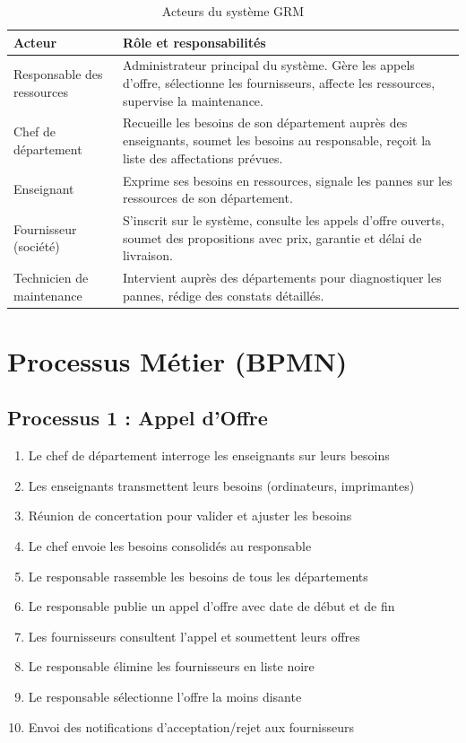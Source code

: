\begin{table}[h!]
\centering
\begin{tabularx}{\textwidth}{|l|X|}
\hline
\textbf{Acteur} & \textbf{Rôle et responsabilités} \\
\hline
Responsable des ressources & Administrateur principal du système. Gère les appels d'offre, sélectionne les fournisseurs, affecte les ressources, supervise la maintenance. \\
\hline
Chef de département & Recueille les besoins de son département auprès des enseignants, soumet les besoins au responsable, reçoit la liste des affectations prévues. \\
\hline
Enseignant & Exprime ses besoins en ressources, signale les pannes sur les ressources de son département. \\
\hline
Fournisseur (société) & S'inscrit sur le système, consulte les appels d'offre ouverts, soumet des propositions avec prix, garantie et délai de livraison. \\
\hline
Technicien de maintenance & Intervient auprès des départements pour diagnostiquer les pannes, rédige des constats détaillés. \\
\hline
\end{tabularx}
\caption{Acteurs du système GRM}
\end{table}

\section{Processus Métier (BPMN)}

\subsection{Processus 1 : Appel d'Offre}

\begin{enumerate}
    \item Le chef de département interroge les enseignants sur leurs besoins
    \item Les enseignants transmettent leurs besoins (ordinateurs, imprimantes)
    \item Réunion de concertation pour valider et ajuster les besoins
    \item Le chef envoie les besoins consolidés au responsable
    \item Le responsable rassemble les besoins de tous les départements
    \item Le responsable publie un appel d'offre avec date de début et de fin
    \item Les fournisseurs consultent l'appel et soumettent leurs offres
    \item Le responsable élimine les fournisseurs en liste noire
    \item Le responsable sélectionne l'offre la moins disante
    \item Envoi des notifications d'acceptation/rejet aux fournisseurs
\end{enumerate}


